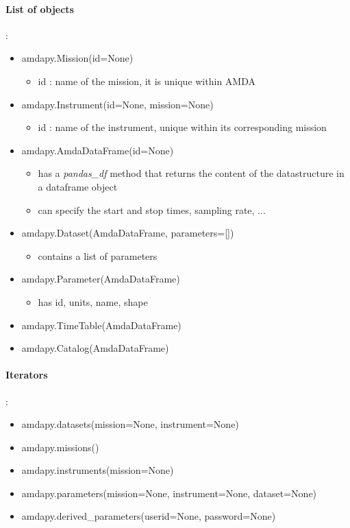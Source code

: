 \documentclass[a4paper,11pt]{report}
\begin{document}
\paragraph{List of objects} : 
\begin{itemize}
	\item amdapy.Mission(id=None)
	\begin{itemize}
		\item id : name of the mission, it is unique within AMDA
	\end{itemize}
	\item amdapy.Instrument(id=None, mission=None)
	\begin{itemize}
		\item id : name of the instrument, unique within its corresponding mission
	\end{itemize}
	\item amdapy.AmdaDataFrame(id=None)
	\begin{itemize}
		\item has a \emph{pandas\_df} method that returns the content of the datastructure in a dataframe object
		\item can specify the start and stop times, sampling rate, ...
	\end{itemize}
	\item amdapy.Dataset(AmdaDataFrame, parameters=[])
	\begin{itemize}
		\item contains a list of parameters
	\end{itemize}
	\item amdapy.Parameter(AmdaDataFrame)
	\begin{itemize}
		\item has id, units, name, shape
	\end{itemize}
	\item amdapy.TimeTable(AmdaDataFrame)
	\item amdapy.Catalog(AmdaDataFrame)
\end{itemize}

\paragraph{Iterators} : 
\begin{itemize}
	\item amdapy.datasets(mission=None, instrument=None)
	\item amdapy.missions() 
	\item amdapy.instruments(mission=None)
	\item amdapy.parameters(mission=None, instrument=None, dataset=None)
	\item amdapy.derived\_parameters(userid=None, password=None)
\end{itemize}
\end{document}
